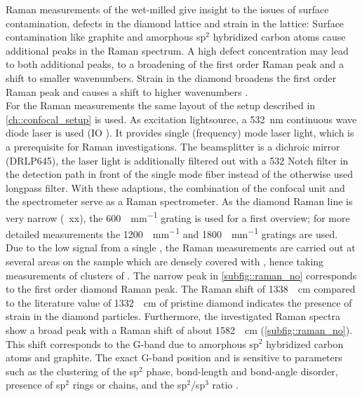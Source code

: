 		Raman measurements of the wet-milled \nds give insight to the issues of surface contamination, defects in the diamond lattice and strain in the lattice:
		Surface contamination like graphite and amorphous sp$^2$ hybridized carbon atoms cause additional peaks in the Raman spectrum. 
		A high defect concentration may lead to both additional peaks, to a broadening of the first order Raman peak and a shift to smaller wavenumbers.
		Strain in the diamond broadens the first order Raman peak and causes a shift to higher wavenumbers \cite{Zaitsev2001,Prawer2004,Orwa2000}.
		\\
		For the Raman measurements the same layout of the setup described in \autoref{ch::confocal_setup} is used.
		As excitation lightsource, a \SI{532}{nm} continuous wave diode laser is used (IO ).
		It provides single (frequency) mode laser light, which is a prerequisite for Raman investigations.
		The beamsplitter is a dichroic mirror (DRLP645), the laser light is additionally filtered out with a 532 Notch filter in the detection path in front of the single mode fiber instead of the otherwise used longpass filter.
		With these adaptions, the combination of the confocal unit and the spectrometer serve as a Raman spectrometer.
		As the diamond Raman line is very narrow (~xx), the \SI[per-mode=symbol]{600}{\lines\per\mm} grating is used for a first overview; for more detailed measurements the \SI[per-mode=symbol]{1200}{\lines\per\mm} and \SI[per-mode=symbol]{1800}{\lines\per\mm} gratings are used.
		\\
		Due to the low signal from a single \nd, the Raman measurements are carried out at several areas on the sample \insituS which are densely covered with \nds, hence taking measurements of clusters of \nds.
		The narrow peak in \autoref{subfig::raman_no} corresponds to the first order diamond Raman peak.
		The Raman shift of \SI{1338}{\per\centi\meter} compared to the literature value of \SI{1332}{\per\centi\meter} of pristine diamond \cite{Zaitsev2001} indicates the presence of strain in the diamond particles.
		Furthermore, the investigated Raman spectra show a broad peak with a Raman shift of about \SI{1582}{\per\centi\meter} (\autoref{subfig::raman_no}).
		This shift corresponds to the G-band due to amorphous sp$^2$ hybridized carbon atoms and graphite.
		The exact G-band position and \lw is sensitive to parameters such as the clustering of the sp$^2$ phase, bond-length and bond-angle disorder, presence of sp$^2$ rings or chains, and the sp$^2$/sp$^3$ ratio \cite{Ferrari2004}.

